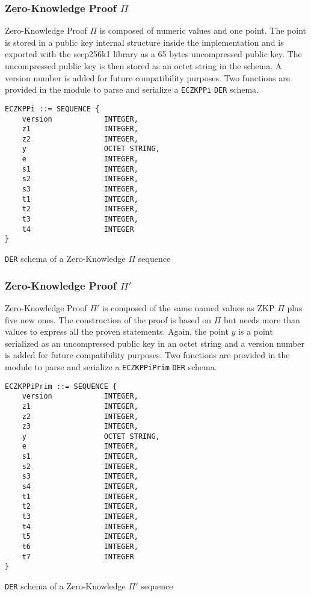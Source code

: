 \subsubsection{Zero-Knowledge Proof $\Pi$}

Zero-Knowledge Proof $\Pi$ is composed of numeric values and one point. The point
is stored in a public key internal structure inside the implementation and is
exported with the secp256k1 library as a 65 bytes uncompressed public key. The
uncompressed public key is then stored as an octet string in the schema. A version
number is added for future compatibility purposes.
Two functions are provided in the module to parse and serialize a \texttt{ECZKPPi}
\texttt{DER} schema.

\begin{listing}
  \begin{verbatim}
ECZKPPi ::= SEQUENCE {
    version            INTEGER,
    z1                 INTEGER,
    z2                 INTEGER,
    y                  OCTET STRING,
    e                  INTEGER,
    s1                 INTEGER,
    s2                 INTEGER,
    s3                 INTEGER,
    t1                 INTEGER,
    t2                 INTEGER,
    t3                 INTEGER,
    t4                 INTEGER
}
  \end{verbatim}
	\caption{\texttt{DER} schema of a Zero-Knowledge $\Pi$ sequence}
	\label{lst:DERSchemaZKPPi}
\end{listing}

\subsubsection{Zero-Knowledge Proof $\Pi'$}

Zero-Knowledge Proof $\Pi'$ is composed of the same named values as ZKP $\Pi$ plus
five new ones. The construction of the proof is based on $\Pi$ but needs more than
values to express all the proven statements. Again, the point $y$ is a point
serialized as an uncompressed public key in an octet string and a version number
is added for future compatibility purposes.
Two functions are provided in the module to parse and serialize a \texttt{ECZKPPiPrim}
\texttt{DER} schema.

\begin{listing}
  \begin{verbatim}
ECZKPPiPrim ::= SEQUENCE {
    version            INTEGER,
    z1                 INTEGER,
    z2                 INTEGER,
    z3                 INTEGER,
    y                  OCTET STRING,
    e                  INTEGER,
    s1                 INTEGER,
    s2                 INTEGER,
    s3                 INTEGER,
    s4                 INTEGER,
    t1                 INTEGER,
    t2                 INTEGER,
    t3                 INTEGER,
    t4                 INTEGER,
    t5                 INTEGER,
    t6                 INTEGER,
    t7                 INTEGER
}
  \end{verbatim}
	\caption{\texttt{DER} schema of a Zero-Knowledge $\Pi'$ sequence}
	\label{lst:DERSchemaZKPPi2}
\end{listing}


